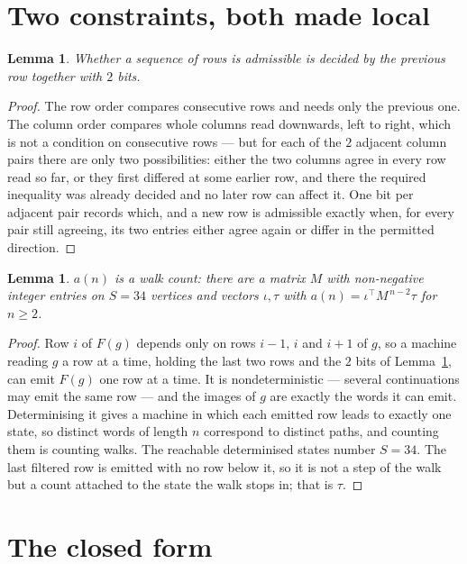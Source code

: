\documentclass[11pt,a4paper]{article}
\theoremstyle{plain}
\newtheorem{lemma}[theorem]{Lemma}
\theoremstyle{definition}
\begin{document}
\section{Two constraints, both made local}

\begin{lemma}\label{lem:local}
Whether a sequence of rows is admissible is decided by the previous row together with
$2$ bits.
\end{lemma}

\begin{proof}
The row order compares consecutive rows and needs only the previous one. The column order
compares whole columns read downwards, left to right, which is not a condition on consecutive
rows --- but for each of the $2$ adjacent column pairs there are only two possibilities:
either the two columns agree in every row read so far, or they first differed at some earlier
row, and there the required inequality was already decided and no later row can affect it. One
bit per adjacent pair records which, and a new row is admissible exactly when, for every pair
still agreeing, its two entries either agree again or differ in the permitted direction.
\end{proof}

\begin{lemma}\label{lem:det}
$a(n)$ is a walk count: there are a matrix $M$ with non-negative integer entries on $S=34$
vertices and vectors $\iota,\tau$ with $a(n)=\iota^{\!\top}M^{\,n-2}\tau$ for $n\ge2$.
\end{lemma}

\begin{proof}
Row $i$ of $F(g)$ depends only on rows $i-1$, $i$ and $i+1$ of $g$, so a machine reading $g$ a
row at a time, holding the last two rows and the $2$ bits of Lemma~\ref{lem:local}, can
emit $F(g)$ one row at a time. It is nondeterministic --- several continuations may emit the
same row --- and the images of $g$ are exactly the words it can emit. Determinising it gives a
machine in which each emitted row leads to exactly one state, so distinct words of length $n$
correspond to distinct paths, and counting them is counting walks. The reachable determinised
states number $S=34$. The last filtered row is emitted with no row below it, so it is not a
step of the walk but a count attached to the state the walk stops in; that is $\tau$.
\end{proof}

\section{The closed form}
\end{document}
